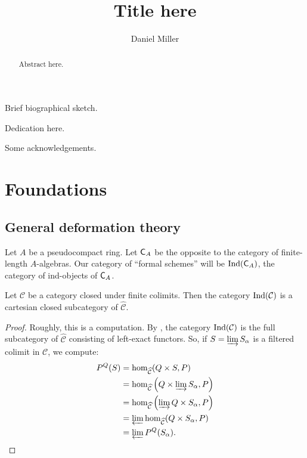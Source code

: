 \documentclass[phd,cornellheadings,draft]{cornell}
\title{Title here}
\author{Daniel Miller}
\begin{document}
\maketitle
\makecopyright

\begin{abstract}
Abstract here. 
\end{abstract}

\begin{biosketch}
Brief biographical sketch.
\end{biosketch}

\begin{dedication}
Dedication here.
\end{dedication}

\begin{acknowledgements}
Some acknowledgements.
\end{acknowledgements}

\contentspage

\normalspacing
\setcounter{page}{1}
\pagestyle{cornell}










\chapter{Foundations}

\section{General deformation theory}

Let $A$ be a pseudocompact ring. Let $\mathsf{C}_A$ be the opposite to the 
category of finite-length $A$-algebras. Our category of ``formal schemes'' will 
be $\operatorname{Ind}(\mathsf{C}_A)$, the category of ind-objects of $\mathsf{C}_A$. 

\begin{theorem}
Let $\mathcal C$ be a category closed under finite colimits. Then the category 
$\operatorname{Ind}(\mathcal C)$ is a cartesian closed subcategory of 
$\widehat{\mathcal C}$. 
\end{theorem}
\begin{proof}
Roughly, this is a computation. By \cite[6.1.7]{kashiwara-schapira-2006}, the 
category $\operatorname{Ind}(\mathcal C)$ is the full subcategory of $\widehat{\mathcal C}$ 
consisting of left-exact functors. So, if $S=\varinjlim S_\alpha$ is a filtered 
colimit in $\mathcal C$, we compute:
\begin{align*}
	P^Q(S)
		&= \hom_{\widehat{\mathcal C}}(Q\times S,P) \\
		&= \hom_{\widehat{\mathcal C}}\left(Q\times \varinjlim S_\alpha,P\right) \\
		&= \hom_{\widehat{\mathcal C}}\left(\varinjlim Q\times S_\alpha,P\right) \\
		&= \varprojlim\hom_{\widehat{\mathcal C}}(Q\times S_\alpha,P) \\
		&= \varprojlim P^Q(S_\alpha) .
\end{align*}
\end{proof}
\end{document}
